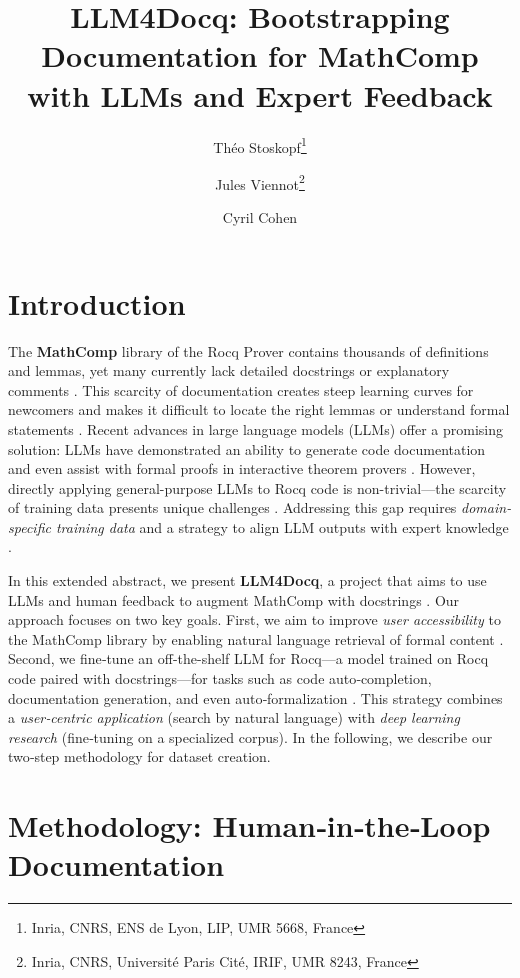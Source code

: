 \documentclass[11pt,a4paper]{article}
\title{LLM4Docq: Bootstrapping Documentation for MathComp with LLMs and Expert Feedback}
\author{
   Théo Stoskopf\thanks{Inria, CNRS, ENS de Lyon, LIP, UMR 5668, France}
  \and Jules Viennot\thanks{Inria, CNRS, Université Paris Cité, IRIF, UMR 8243, France}
  \and Cyril Cohen\footnotemark[1]
}
\date{}
\begin{document}
\maketitle

\section*{Introduction}

The \textbf{MathComp} \cite{mathcomp} library of the Rocq Prover contains thousands of definitions and lemmas, yet many currently lack detailed docstrings or explanatory comments \cite{florath2024coqlm,docstring_findings}. This scarcity of documentation creates steep learning curves for newcomers and makes it difficult to locate the right lemmas or understand formal statements \cite{Lu2025leanfinder,dvivedi2023comparative}. Recent advances in large language models (LLMs) offer a promising solution: LLMs have demonstrated an ability to generate code documentation and even assist with formal proofs in interactive theorem provers \cite{chakrabarty2024codedoc,song2025leancopilot,azerbayes2024llemma,wang2024theoremllama,kozyrev2024coqpilot}. However, directly applying general-purpose LLMs to Rocq code is non-trivial—the scarcity of training data presents unique challenges \cite{florath2024coqlm,thompson2025rango}. Addressing this gap requires \emph{domain-specific training data} and a strategy to align LLM outputs with expert knowledge \cite{ouyang2022rlhf}.

In this extended abstract, we present \textbf{LLM4Docq}, a project that aims to use LLMs and human feedback to augment MathComp with docstrings \cite{chakrabarty2024codedoc}. Our approach focuses on two key goals. First, we aim to improve \emph{user accessibility} to the MathComp library by enabling natural language retrieval of formal content \cite{Lu2025leanfinder}. Second, we fine‑tune an off-the-shelf LLM for Rocq—a model trained on Rocq code paired with docstrings—for tasks such as code auto‑completion, documentation generation, and even auto‑formalization \cite{lu2025autoformalization}. This strategy combines a \emph{user‑centric application} (search by natural language) with \emph{deep learning research} (fine‑tuning on a specialized corpus). In the following, we describe our two‑step methodology for dataset creation.

\section*{Methodology: Human‑in‑the‑Loop Documentation}
\end{document}
